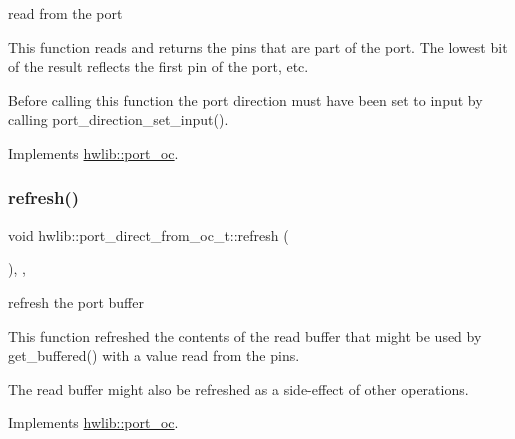 read from the port

This function reads and returns the pins that are part of the port. The lowest bit of the result reflects the first pin of the port, etc.

Before calling this function the port direction must have been set to input by calling port\+\_\+direction\+\_\+set\+\_\+input(). 

Implements \hyperlink{classhwlib_1_1port__oc_a422b02326f14332df44863adced18427}{hwlib\+::port\+\_\+oc}.

\mbox{\label{classhwlib_1_1port__direct__from__oc__t_a9144abbeca4e68f016bbfea05395d039}} 
\subsubsection{\texorpdfstring{refresh()}{refresh()}}
{\footnotesize\ttfamily void hwlib\+::port\+\_\+direct\+\_\+from\+\_\+oc\+\_\+t\+::refresh (\begin{DoxyParamCaption}{ }\end{DoxyParamCaption})\hspace{0.3cm}{\ttfamily [inline]}, {\ttfamily [override]}, {\ttfamily [virtual]}}





refresh the port buffer

This function refreshed the contents of the read buffer that might be used by get\+\_\+buffered() with a value read from the pins.

The read buffer might also be refreshed as a side-\/effect of other operations. 

Implements \hyperlink{classhwlib_1_1port__oc_aa4488183f5cf241ba48ad4dd1a89e42a}{hwlib\+::port\+\_\+oc}.

\mbox{\label{classhwlib_1_1port__direct__from__oc__t_ab420ae508634aa891cb699f1e9972616}} 
